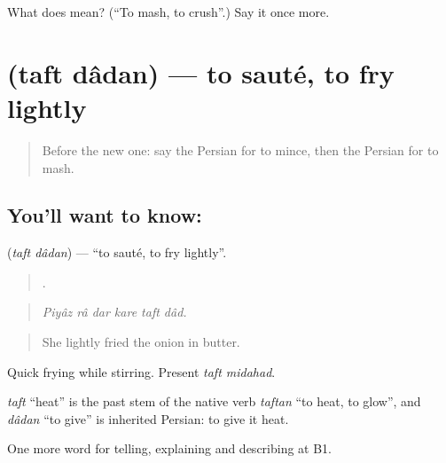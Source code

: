 \begin{tcolorbox}[breakable,colback=teal!4,colframe=teal!35!black,title={Before you move on}]
What does   mean? (\textquotedblleft{}To mash, to crush\textquotedblright{}.) Say it once more.
\end{tcolorbox}
\section[\texorpdfstring{\fa{تفت} \fa{دادن} (taft dâdan)}{تفت دادن (taft dâdan)}]{  (taft dâdan) — to sauté, to fry lightly}

\label{lesson:FA-C356-taft-dadan}



\begin{quote}
Before the new one: say the Persian for to mince, then the Persian for to mash.
\end{quote}

\subsection*{You'll want to know:  }
\textbf{ } (\emph{taft dâdan}) — \textquotedblleft{}to sauté, to fry lightly\textquotedblright{}.

\begin{quote}
     .
\end{quote}

\begin{quote}
\emph{Piyâz râ dar kare taft dâd.}
\end{quote}

\begin{quote}
She lightly fried the onion in butter.
\end{quote}

Quick frying while stirring. Present \emph{taft midahad}.

\begin{cousinweb}
\emph{taft} \textquotedblleft{}heat\textquotedblright{} is the past stem of the native verb \emph{taftan} \textquotedblleft{}to heat, to glow\textquotedblright{}, and \emph{dâdan} \textquotedblleft{}to give\textquotedblright{} is inherited Persian: to give it heat.
\end{cousinweb}

\begin{grammarlens}[title={What you've built}]
One more word for telling, explaining and describing at B1.
\end{grammarlens}

